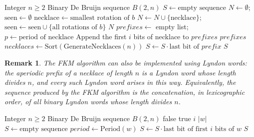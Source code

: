 \documentclass{article}
\newtheorem{remark}{Remark}
\theoremstyle{definition}
\begin{document}
\begin{algorithm}
\caption{FKM Algorithm for $B(2, n)$}
\begin{algorithmic}[1]
\Require Integer $n \geq 2$
\Ensure Binary De Bruijn sequence $B(2, n)$
\State $S \gets \text{empty sequence}$
    \State $N \gets \emptyset$; $\text{seen} \gets \emptyset$
            \State $\text{necklace} \gets \text{smallest rotation of } b$
            \State $N \gets N \cup \{\text{necklace}\}$; $\text{seen} \gets \text{seen} \cup \{\text{all rotations of } b\}$
        \EndIf
    \EndFor
    \State \Return $N$
\EndFunction
{}
    \State $prefixes \gets$ empty list; $p \gets \text{period of necklace}$
        \State Append the first $i$ bits of necklace to $prefixes$
    \EndFor
    \State \Return $prefixes$
\EndFunction
\State $necklaces \gets \text{Sort}(\text{GenerateNecklaces}(n))$
        \State $S \gets S \cdot \text{last bit of } prefix$
    \EndFor
\EndFor
\State \Return $S$
\end{algorithmic}
\end{algorithm}

\begin{remark}
The FKM algorithm can also be implemented using Lyndon words: the aperiodic prefix of a necklace of length $n$ is a Lyndon word whose length divides $n$, and every such Lyndon word arises in this way. Equivalently, the sequence produced by the FKM algorithm is the concatenation, in lexicographic order, of all binary Lyndon words whose length divides $n$.
\end{remark}

\begin{algorithm}
\caption{Lyndon-based FKM Algorithm}
\begin{algorithmic}[1]
\Require Integer $n \geq 2$
\Ensure Binary De Bruijn sequence $B(2, n)$
            \State \Return false
        \EndIf
    \EndFor
    \State \Return true
\EndFunction
{}
         \Return $i$ \EndIf
    \EndFor
    \State \Return $|w|$
\EndFunction
\State $S \gets \text{empty sequence}$
        \State $period \gets \text{Period}(w)$ 
            \State $S \gets S \cdot \text{last bit of first } i \text{ bits of } w$
        \EndFor
    \EndIf
\EndFor
\State \Return $S$
\end{algorithmic}
\end{algorithm}
\end{document}
